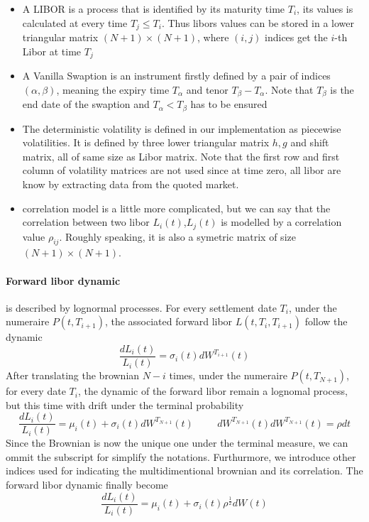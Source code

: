 \documentclass[a4paper,10pt]{article}
\newcommand{\Ti}{T_{i}}
\newcommand{\Ta}{T_{\alpha}}
\newcommand{\Tb}{T_{\beta}}
\newcommand{\Tii}{T_{i+1}}
\newcommand{\Ptii}{P(t,T_{i+1})}
\newcommand{\Lti}{L(t,\Ti,\Tii)}
\newcommand{\Lit}{L_{i}(t)}
\newcommand{\muit}{\mu_i(t)}
\newcommand{\sigmait}{\sigma_i(t)}
\newcommand{\Wit}{W^{\Tii}(t)}
\newcommand{\Wnt}{W^{T_{N+1}}(t)}
\newcommand{\Ljt}{L_{j}(t)}
\newcommand{\rhoij}{\rho_{ij}}
\begin{document}
\begin{itemize}
 \item A LIBOR is a process that is identified by its maturity time $T_i$, its values is calculated at every time $T_j\leq T_i$. Thus libors values can be stored in a lower triangular matrix $(N+1)\times(N+1)$, where $(i,j)$ indices get the $i$-th Libor at time $T_j$
 \item A Vanilla Swaption is an instrument firstly defined by a pair of indices $(\alpha,\beta)$, meaning the expiry time $\Ta$ and tenor $\Tb-\Ta$. Note that $\Tb$ is the end date of the swaption and $\Ta<\Tb$ has to be ensured
 \item The deterministic volatility is defined in our implementation as piecewise volatilities. It is defined by three lower triangular matrix $h,g$ and shift matrix, all of same size as Libor matrix. Note that the first row and first column of volatility matrices are not used since at time zero, all libor are know by extracting data from the quoted market.
 \item correlation model is a little more complicated, but we can say that the correlation between two libor $\Lit$,$\Ljt$ is modelled by a correlation value $\rhoij$. Roughly speaking, it is also a symetric matrix of size $(N+1)\times(N+1)$.   
\end{itemize}
\paragraph{Forward libor dynamic } is described by lognormal processes. For every settlement date $\Ti$, under the numeraire $\Ptii$, the associated forward libor $\Lti$ follow the dynamic
\[
\frac{d\Lit}{\Lit} = \sigmait d\Wit
\]
After translating the brownian $N-i$ times, under the numeraire $P(t,T_{N+1})$, for every date $\Ti$, the dynamic of the forward libor remain a lognomal process, but this time with drift under the terminal probability  
\[
\frac{d\Lit}{\Lit} = \muit + \sigmait d\Wnt
\hspace{1cm}
d\Wnt d\Wnt = \rho dt
\]
Since the Brownian is now the unique one under the terminal measure, we can ommit the subscript for simplify the notations. Furthurmore, we introduce other indices used for indicating the multidimentional brownian and its correlation. The forward libor dynamic finally become
\[
\frac{d\Lit}{\Lit} = \muit + \sigmait \rho^{\frac{1}{2} } dW(t)
\]
\end{document}
